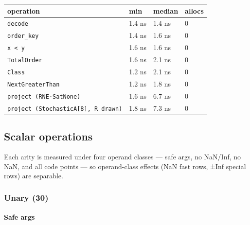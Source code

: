 \begin{table}[h]
\centering
\begin{tabulary}{\linewidth}{L L L L}
\toprule
operation & min & median & allocs \\
\toprule
\texttt{decode} & 1.4 ns & 1.4 ns & 0 \\
\texttt{order\_\allowbreak{}key} & 1.4 ns & 1.6 ns & 0 \\
\texttt{x < y} & 1.6 ns & 1.6 ns & 0 \\
\texttt{TotalOrder} & 1.6 ns & 2.1 ns & 0 \\
\texttt{Class} & 1.2 ns & 2.1 ns & 0 \\
\texttt{NextGreaterThan} & 1.2 ns & 1.8 ns & 0 \\
\texttt{project (RNE·SatNone)} & 1.6 ns & 6.7 ns & 0 \\
\texttt{project (\allowbreak{}StochasticA[8], R drawn)} & 1.8 ns & 7.3 ns & 0 \\
\bottomrule
\end{tabulary}

\end{table}



\subsection{Scalar operations}



\label{11509067801894334317}{}


Each arity is measured under four operand classes — safe args, no NaN/Inf, no NaN, and all code points — so operand-class effects (NaN fast rows, ±Inf special rows) are separable.




\clearpage



\subsubsection{Unary (30)}



\label{2812026322430809105}{}


\paragraph{Safe args}\indent



\label{15024080724600605730}{}


